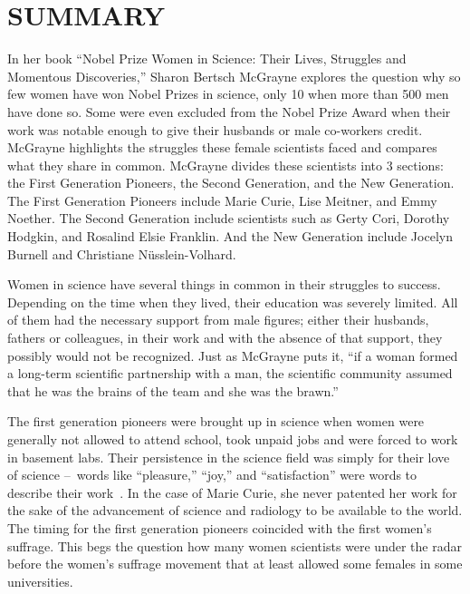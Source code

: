 \par
\section*{SUMMARY}

In her book “Nobel Prize Women in Science: Their Lives, Struggles and Momentous Discoveries,” Sharon Bertsch McGrayne explores the question why so few women have won Nobel Prizes in science, only 10 when more than 500 men have done so. Some were even excluded from the Nobel Prize Award when their work was notable enough to give their husbands or male co-workers credit. McGrayne highlights the struggles these female scientists faced and compares what they share in common. McGrayne divides these scientists into 3 sections: the First Generation Pioneers, the Second Generation, and the New Generation. The First Generation Pioneers include Marie Curie, Lise Meitner, and Emmy Noether. The Second Generation include scientists such as Gerty Cori, Dorothy Hodgkin, and Rosalind Elsie Franklin. And the New Generation include Jocelyn Burnell and Christiane Nüsslein-Volhard.

\par
Women in science have several things in common in their struggles to success. Depending on the time when they lived, their education was severely limited. All of them had the necessary support from male figures; either their husbands, fathers or colleagues, in their work and with the absence of that support, they possibly would not be recognized. Just as McGrayne puts it, ``if a woman formed a long-term scientific partnership with a man, the scientific community assumed that he was the brains of the team and she was the brawn.''~\cite{nobelprize}

\par
The first generation pioneers were brought up in science when women were generally not allowed to attend school, took unpaid jobs and were forced to work in basement labs. Their persistence in the science field was simply for their love of science --\ words like ``pleasure,'' ``joy,'' and ``satisfaction'' were words to describe their work~\cite{nobelprize}. In the case of Marie Curie, she never patented her work for the sake of the advancement of science and radiology to be available to the world. The timing for the first generation pioneers coincided with the first women’s suffrage. This begs the question how many women scientists were under the radar before the women’s suffrage movement that at least allowed some females in some universities. 

